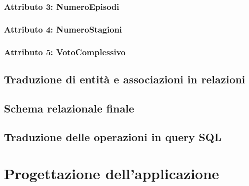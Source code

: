 \documentclass[a4paper,12pt]{report}
\begin{document}
\subsection{Attributo 3: NumeroEpisodi}
\subsection{Attributo 4: NumeroStagioni}
\subsection{Attributo 5: VotoComplessivo}
\section{Traduzione di entità e associazioni in relazioni}
\section{Schema relazionale finale}
\section{Traduzione delle operazioni in query SQL}
\chapter{Progettazione dell'applicazione}
\end{document}
